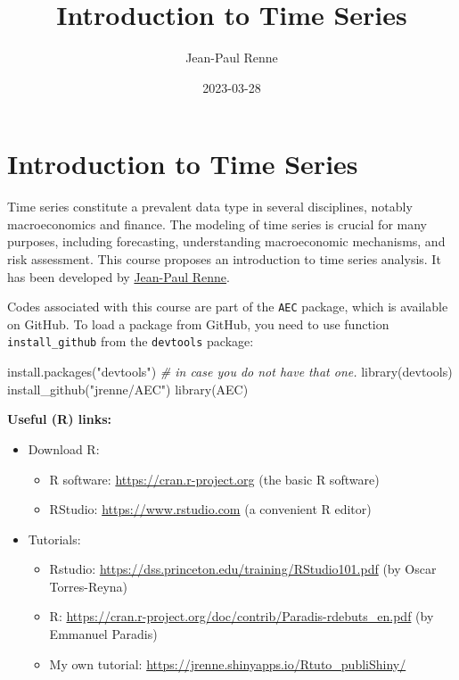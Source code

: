 \documentclass[
  12pt,
]{book}
\title{Introduction to Time Series}
\author{Jean-Paul Renne}
\date{2023-03-28}
\newenvironment{Shaded}{\begin{snugshade}}{\end{snugshade}}
\newcommand{\CommentTok}[1]{\textcolor[rgb]{0.56,0.35,0.01}{\textit{#1}}}
\newcommand{\FunctionTok}[1]{\textcolor[rgb]{0.00,0.00,0.00}{#1}}
\newcommand{\NormalTok}[1]{#1}
\newcommand{\StringTok}[1]{\textcolor[rgb]{0.31,0.60,0.02}{#1}}
\providecommand{\tightlist}{%
  \setlength{\itemsep}{0pt}\setlength{\parskip}{0pt}}
\theoremstyle{definition}
\theoremstyle{definition}
\theoremstyle{definition}
\theoremstyle{definition}
\theoremstyle{remark}
\begin{document}
\maketitle

{
\setcounter{tocdepth}{1}
\tableofcontents
}
\newcommand{\bv}[1]{\mathbf{#1}}

\hypertarget{intro}{%
\chapter*{Introduction to Time Series}\label{intro}}

Time series constitute a prevalent data type in several disciplines, notably macroeconomics and finance. The modeling of time series is crucial for many purposes, including forecasting, understanding macroeconomic mechanisms, and risk assessment. This course proposes an introduction to time series analysis. It has been developed by \href{https://sites.google.com/site/jeanpaulrenne/home}{Jean-Paul Renne}.

Codes associated with this course are part of the \texttt{AEC} package, which is available on GitHub. To load a package from GitHub, you need to use function \texttt{install\_github} from the \texttt{devtools} package:

\begin{Shaded}
\begin{Highlighting}[]
\FunctionTok{install.packages}\NormalTok{(}\StringTok{"devtools"}\NormalTok{) }\CommentTok{\# in case you do not have that one.}
\FunctionTok{library}\NormalTok{(devtools)}
\FunctionTok{install\_github}\NormalTok{(}\StringTok{"jrenne/AEC"}\NormalTok{)}
\FunctionTok{library}\NormalTok{(AEC)}
\end{Highlighting}
\end{Shaded}

\textbf{Useful (R) links:}

\begin{itemize}
\item
  Download R:

  \begin{itemize}
  \tightlist
  \item
    R software: \url{https://cran.r-project.org} (the basic R software)
  \item
    RStudio: \url{https://www.rstudio.com} (a convenient R editor)
  \end{itemize}
\item
  Tutorials:

  \begin{itemize}
  \tightlist
  \item
    Rstudio: \url{https://dss.princeton.edu/training/RStudio101.pdf} (by Oscar Torres-Reyna)
  \item
    R: \url{https://cran.r-project.org/doc/contrib/Paradis-rdebuts_en.pdf} (by Emmanuel Paradis)
  \item
    My own tutorial: \url{https://jrenne.shinyapps.io/Rtuto_publiShiny/}
  \end{itemize}
\end{itemize}
\end{document}

